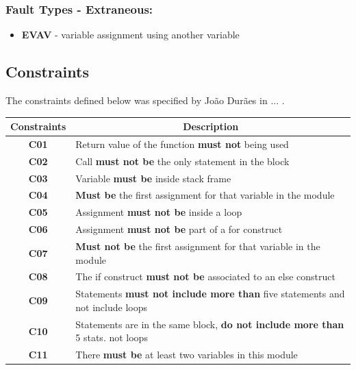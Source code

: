 \subsubsection{Fault Types - Extraneous:}
\begin{itemize}
	\item \textbf{EVAV} - variable assignment using another variable
\end{itemize}

\subsection{Constraints}

The constraints defined below was specified by João Durães in ... .

\begin{table}[ht]
\centering
\begin{tabular}{|c|l|}
\hline
\textbf{Constraints}            & \multicolumn{1}{c|}{\textbf{Description}}                                     \\ \hline \hline
\textbf{C01}       \label{C01}  & Return value of the function \textbf{must not} being used                              \\ \hline
\textbf{C02}       \label{C02}  & Call \textbf{must not be} the only statement in the block                              \\ \hline
\textbf{C03}       \label{C03}  & Variable \textbf{must be} inside stack frame                                           \\ \hline
\textbf{C04}       \label{C04}  & \textbf{Must be} the first assignment for that variable in the module                  \\ \hline
\textbf{C05}       \label{C05}  & Assignment \textbf{must not be} inside a loop                                          \\ \hline
\textbf{C06}       \label{C06}  & Assignment \textbf{must not be} part of a for construct                                \\ \hline
\textbf{C07}       \label{C07}  & \textbf{Must not be} the first assignment for that variable in the module              \\ \hline
\textbf{C08}       \label{C08}  & The if construct \textbf{must not be} associated to an else construct                  \\ \hline
\textbf{C09}       \label{C09}  & Statements \textbf{must not include more than} five statements and not include loops   \\ \hline
\textbf{C10}       \label{C010} & Statements are in the same block, \textbf{do not include more than} 5 stats. not loops \\ \hline
\textbf{C11}       \label{C011} & There \textbf{must be} at least two variables in this module                           \\ \hline
\end{tabular}
\end{table}

